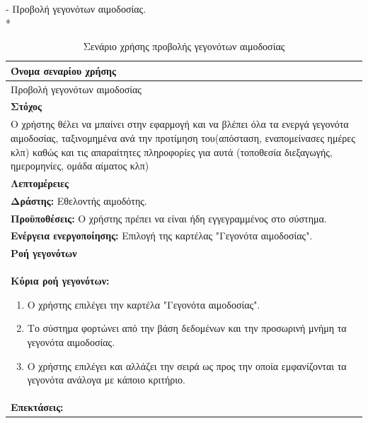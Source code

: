 \newpage
- Προβολή  γεγονότων αιμοδοσίας.
\\*
\begin{table}[H]	
	\begin{center}
	    \begin{tabular}{|p{\dimexpr \linewidth-2\tabcolsep}|}
	    \hline
	    \rowcolor{grayy}
	    \textbf{Όνομα σεναρίου χρήσης}
	    \\ \hline    
	    Προβολή γεγονότων αιμοδοσίας
	     \\ \hline
	    \rowcolor{grayy}
	    \textbf{\textbf{Στόχος}}
	    \\ \hline
	    	Ο χρήστης θέλει να μπαίνει στην εφαρμογή και να βλέπει όλα τα ενεργά γεγονότα αιμοδοσίας, ταξινομημένα ανά την προτίμηση του(απόσταση, εναπομείνασες ημέρες κλπ) καθώς και τις απαραίτητες πληροφορίες για αυτά (τοποθεσία διεξαγωγής, ημερομηνίες, ομάδα αίματος κλπ)
	    \\ \hline
	    \rowcolor{grayy}
	    \textbf{Λεπτομέρειες}
	    \\ \hline
		\textbf{Δράστης:} Εθελοντής αιμοδότης.
		\\*
		\textbf{Προϋποθέσεις:} Ο χρήστης πρέπει να είναι ήδη εγγεγραμμένος στο σύστημα.
		\\*
		\textbf{Ενέργεια ενεργοποίησης:} Επιλογή της καρτέλας "Γεγονότα αιμοδοσίας".
	    \\ \hline
		\rowcolor{grayy}    
	    \textbf{Ροή γεγονότων}
	    \\ \hline
		\textbf{Κύρια ροή γεγονότων:}
		\begin{enumerate}
			\item	Ο χρήστης επιλέγει την καρτέλα "Γεγονότα αιμοδοσίας".
			\item Το σύστημα φορτώνει από την βάση δεδομένων και την προσωρινή μνήμη τα γεγονότα αιμοδοσίας.
			\item Ο χρήστης επιλέγει και αλλάζει την σειρά ως προς την οποία εμφανίζονται τα γεγονότα ανάλογα με κάποιο κριτήριο.
		\end{enumerate}
				\\ \hline
		\rowcolor{grayy}
		\textbf{Επεκτάσεις:}
		   \\ \hline
	    \end{tabular}
	    \caption{Σενάριο χρήσης προβολής γεγονότων αιμοδοσίας}
	    \label{tab:blood_donation_events_show} 
	\end{center}
\end{table}

